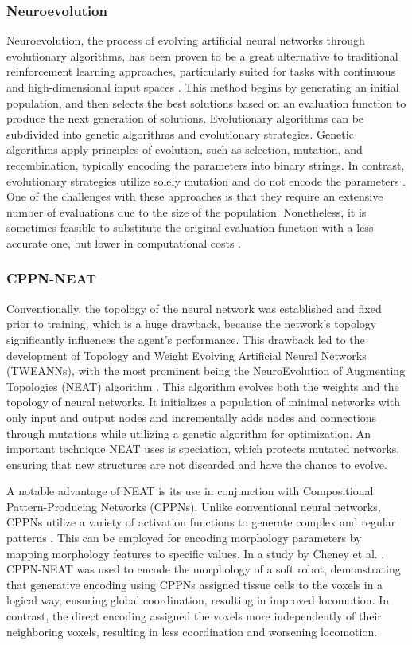     \subsubsection{Neuroevolution}
        Neuroevolution, the process of evolving artificial neural networks through evolutionary algorithms, has been proven to be a great alternative to traditional reinforcement learning approaches, particularly suited for tasks with continuous and high-dimensional input spaces \cite{Pagliuca_2020}. This method begins by generating an initial population, and then selects the best solutions based on an evaluation function to produce the next generation of solutions. Evolutionary algorithms can be subdivided into genetic algorithms and evolutionary strategies. Genetic algorithms apply principles of evolution, such as selection, mutation, and recombination, typically encoding the parameters into binary strings. In contrast, evolutionary strategies utilize solely mutation and do not encode the parameters \cite{Dianati_2002}. One of the challenges with these approaches is that they require an extensive number of evaluations due to the size of the population. Nonetheless, it is sometimes feasible to substitute the original evaluation function with a less accurate one, but lower in computational costs \cite{Echevarrieta_2024}.

    \subsubsection{CPPN-NEAT}
        Conventionally, the topology of the neural network was established and fixed prior to training, which is a huge drawback, because the network's topology significantly influences the agent's performance. This drawback led to the development of Topology and Weight Evolving Artificial Neural Networks (TWEANNs), with the most prominent being the NeuroEvolution of Augmenting Topologies (NEAT) algorithm \cite{Stanley_2002}. This algorithm evolves both the weights and the topology of neural networks. It initializes a population of minimal networks with only input and output nodes and incrementally adds nodes and connections through mutations while utilizing a genetic algorithm for optimization. An important technique NEAT uses is speciation, which protects mutated networks, ensuring that new structures are not discarded and have the chance to evolve.

        A notable advantage of NEAT is its use in conjunction with Compositional Pattern-Producing Networks (CPPNs). Unlike conventional neural networks, CPPNs utilize a variety of activation functions to generate complex and regular patterns \cite{Stanley_2007}. This can be employed for encoding morphology parameters by mapping morphology features to specific values. In a study by Cheney et al. \cite{Cheney_2014}, CPPN-NEAT was used to encode the morphology of a soft robot, demonstrating that generative encoding using CPPNs assigned tissue cells to the voxels in a logical way, ensuring global coordination, resulting in improved locomotion. In contrast, the direct encoding assigned the voxels more independently of their neighboring voxels, resulting in less coordination and worsening locomotion.

